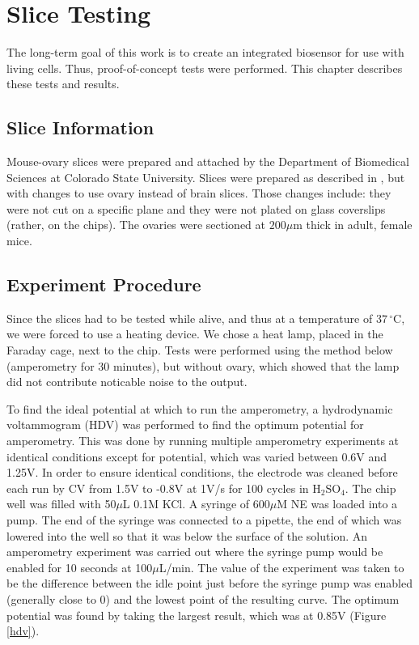\chapter{Slice Testing}

The long-term goal of this work is to create an integrated biosensor for use with living cells. Thus, proof-of-concept tests were performed. This chapter describes these tests and results.

\section{Slice Information}

Mouse-ovary slices were prepared and attached by the Department of Biomedical Sciences at Colorado State University. Slices were prepared as described in \cite{tobet2003vcm}, but with changes to use ovary instead of brain slices. Those changes include: they were not cut on a specific plane and they were not plated on glass coverslips (rather, on the chips). The ovaries were sectioned at $200 \mu \mathrm{m}$ thick in adult, female mice.

\section{Experiment Procedure}

Since the slices had to be tested while alive, and thus at a temperature of $37\,^{\circ}\mathrm{C}$, we were forced to use a heating device. We chose a heat lamp, placed in the Faraday cage, next to the chip. Tests were performed using the method below (amperometry for 30 minutes), but without ovary, which showed that the lamp did not contribute noticable noise to the output.

To find the ideal potential at which to run the amperometry, a hydrodynamic voltammogram (HDV) was performed to find the optimum potential for amperometry. This was done by running multiple amperometry experiments at identical conditions except for potential, which was varied between 0.6V and 1.25V. In order to ensure identical conditions, the electrode was cleaned before each run by CV from 1.5V to -0.8V at 1V/s for 100 cycles in $\mathrm{H}_2 \mathrm{SO}_4$. The chip well was filled with 50$\mu$L 0.1M KCl. A syringe of 600$\mu$M NE was loaded into a pump. The end of the syringe was connected to a pipette, the end of which was lowered into the well so that it was below the surface of the solution. An amperometry experiment was carried out where the syringe pump would be enabled for 10 seconds at 100$\mu$L/min. The value of the experiment was taken to be the difference between the idle point just before the syringe pump was enabled (generally close to 0) and the lowest point of the resulting curve. The optimum potential was found by taking the largest result, which was at 0.85V (Figure \ref{hdv}).

